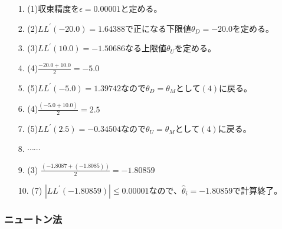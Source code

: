 \documentclass[12pt]{jarticle}
\begin{document}
\begin{itemize}
  \item[1.] (1)収束精度を$\displaystyle\epsilon = 0.00001$と定める。
  \item[2.] (2)$LL^{\prime}(-20.0) = 1.64388$で正になる下限値$\displaystyle\theta_D = -20.0$を定める。
  \item[3.] (3)$LL^{\prime}(10.0) = -1.50686$なる上限値$\displaystyle\theta_U$を定める。
  \item[4.] (4)$\displaystyle \frac{-20.0 + 10.0}{2} = -5.0$
  \item[5.] (5)$\displaystyle LL^{\prime}(-5.0) = 1.39742$なので$\displaystyle\theta_D=\theta_M$として$(4)$に戻る。
  \item[6.]  (4)$\displaystyle \frac{(-5.0 + 10.0)}{2} = 2.5$
  \item[7.] (5)$\displaystyle LL^{\prime}(2.5) = -0.34504$なので$\displaystyle\theta_U=\theta_M$として$(4)$に戻る。
  \item[8.] $\cdots$$\cdots$
  \item[9.] (3)  $\displaystyle \frac{(-1.8087 + (-1.8085))}{2} = -1.80859$
  \item[10.] (7) $\displaystyle |LL^{\prime}(-1.80859)| \leq 0.00001$なので、$\hat{\theta}_i = -1.80859$で計算終了。
\end{itemize}
\subsubsection{ニュートン法}
\end{document}
